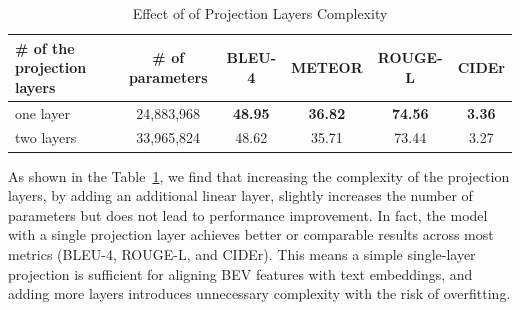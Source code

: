 \documentclass{article} %
\begin{document}
\begin{table}[h]
    \centering
    \small
    \begin{tabular}{lccccc}
        \toprule
        \textbf{\# of the projection layers} & \textbf{\# of parameters} & \textbf{BLEU-4} & \textbf{METEOR} & \textbf{ROUGE-L} & \textbf{CIDEr} \\
        \midrule
one layer  & 24,883,968 & \textbf{48.95} & \textbf{36.82} & \textbf{74.56} & \textbf{3.36} \\
two layers & 33,965,824 & 48.62 & 35.71 & 73.44& 3.27\\
        \bottomrule
    \end{tabular}
    \caption{Effect of of Projection Layers Complexity}
    \label{tab:proj-effect}
\end{table}


As shown in the Table~\ref{tab:proj-effect}, we find that increasing the complexity of the projection layers, by adding an additional linear layer, slightly increases the number of parameters but does not lead to performance improvement. In fact, the model with a single projection layer achieves better or comparable results across most metrics (BLEU-4, ROUGE-L, and CIDEr). This means a simple single-layer projection is sufficient for aligning BEV features with text embeddings, and adding more layers introduces unnecessary complexity with the risk of overfitting.



\clearpage
\end{document}
